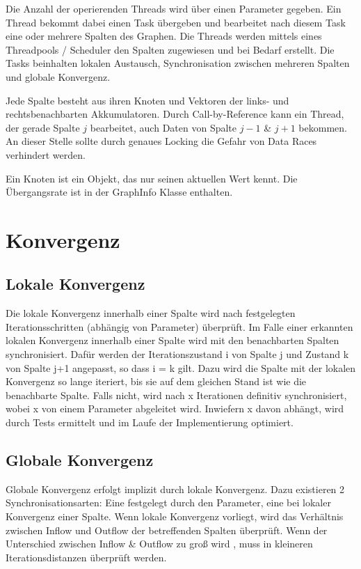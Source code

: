 Die Anzahl der operierenden Threads wird über einen Parameter gegeben. Ein Thread bekommt dabei einen Task übergeben und bearbeitet nach diesem Task eine oder mehrere Spalten des Graphen. Die Threads werden mittels eines Threadpools / Scheduler den Spalten zugewiesen und bei Bedarf erstellt. Die Tasks beinhalten lokalen Austausch, Synchronisation zwischen mehreren Spalten und globale Konvergenz.

Jede Spalte besteht aus ihren Knoten und Vektoren der links- und rechtsbenachbarten Akkumulatoren. Durch Call-by-Reference kann ein Thread, der gerade Spalte $j$ bearbeitet, auch Daten von Spalte $j-1$ \& $j+1$ bekommen. An dieser Stelle sollte durch genaues Locking die Gefahr von Data Races verhindert werden. 

Ein Knoten ist ein Objekt, das nur seinen aktuellen Wert kennt. Die Übergangsrate ist in der GraphInfo Klasse enthalten. 

\section{Konvergenz}
\subsection{Lokale Konvergenz}
Die lokale Konvergenz innerhalb einer Spalte wird nach festgelegten Iterationsschritten (abhängig von Parameter) überprüft. Im Falle einer erkannten lokalen Konvergenz innerhalb einer Spalte wird mit den benachbarten Spalten synchronisiert. Dafür werden der Iterationszustand i von Spalte j und  Zustand k von Spalte j+1 angepasst, so dass i = k gilt. Dazu wird die Spalte mit der lokalen Konvergenz so lange iteriert, bis sie auf dem gleichen Stand ist wie die benachbarte Spalte. Falls nicht, wird nach x Iterationen definitiv synchronisiert, wobei x von einem Parameter abgeleitet wird. Inwiefern x davon abhängt, wird durch Tests ermittelt und im Laufe der Implementierung optimiert. 

\subsection{Globale Konvergenz}
Globale Konvergenz erfolgt implizit durch lokale Konvergenz. Dazu existieren 2 Synchronisationsarten: Eine festgelegt durch den Parameter, eine bei lokaler Konvergenz einer Spalte.
Wenn lokale Konvergenz vorliegt, wird das Verhältnis zwischen Inflow und Outflow der betreffenden Spalten überprüft. Wenn der  Unterschied zwischen Inflow \& Outflow zu groß wird , muss in kleineren Iterationsdistanzen überprüft werden. 


